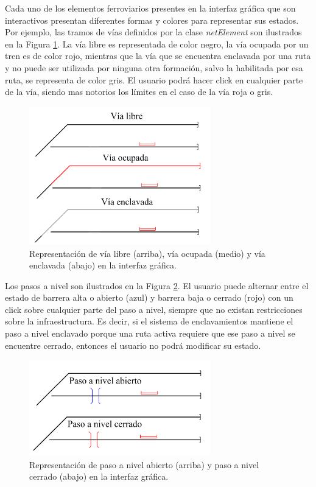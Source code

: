 	Cada uno de los elementos ferroviarios presentes en la interfaz gráfica que son interactivos presentan diferentes formas y colores para representar sus estados. Por ejemplo, las tramos de vías definidos por la clase \textit{netElement} son ilustrados en la Figura \ref{fig:AGG_tracks}. La vía libre es representada de color negro, la vía ocupada por un tren es de color rojo, mientras que la vía que se encuentra enclavada por una ruta y no puede ser utilizada por ninguna otra formación, salvo la habilitada por esa ruta, se representa de color gris. El usuario podrá hacer click en cualquier parte de la vía, siendo mas notorios los límites en el caso de la vía roja o gris.
		
	\begin{figure}[H]
		\centering
		\includegraphics[width=0.7\textwidth]{AGG/images/AGG_via}
		\centering\caption{Representación de vía libre (arriba), vía ocupada (medio) y vía enclavada (abajo) en la interfaz gráfica.}
		\label{fig:AGG_tracks}
	\end{figure}
	
	Los pasos a nivel son ilustrados en la Figura \ref{fig:AGG_levelCrossing}. El usuario puede alternar entre el estado de barrera alta o abierto (azul) y barrera baja o cerrado (rojo) con un click sobre cualquier parte del paso a nivel, siempre que no existan restricciones sobre la infraestructura. Es decir, si el sistema de enclavamientos mantiene el paso a nivel enclavado porque una ruta activa requiere que ese paso a nivel se encuentre cerrado, entonces el usuario no podrá modificar su estado.
	
	\begin{figure}[H]
		\centering
		\includegraphics[width=0.7\textwidth]{AGG/images/AGG_cruce}
		\centering\caption{Representación de paso a nivel abierto (arriba) y paso a nivel cerrado (abajo) en la interfaz gráfica.}
		\label{fig:AGG_levelCrossing}
	\end{figure}
	
